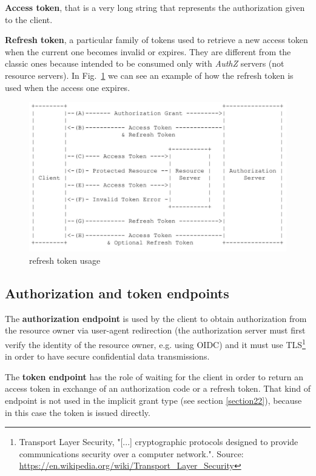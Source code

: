 \textbf{Access token}, that is a very long string that represents the authorization given to the client.

\textbf{Refresh token}, a particular family of tokens used to retrieve a new access token when the current one becomes invalid or expires. They are different from the classic ones because intended to be consumed only with \textit{AuthZ} servers (not resource servers). In Fig.~\ref{fig:refreshtok} we can see an example of how the refresh token is used when the access one expires.



\begin{figure}
    \centering
    \includegraphics[scale=0.5]{chapters/images/chp2/tokenref.jpg}
    \caption{ refresh token usage}
    \label{fig:refreshtok}
\end{figure}

\vspace{1cm}

\subsection{Authorization and token endpoints}
The \textbf{authorization endpoint} is used by the client to obtain authorization from the resource owner via user-agent redirection (the authorization server must first verify the identity of the resource owner, e.g. using OIDC) and it must use TLS\footnote{Transport Layer Security, "[...] cryptographic protocols designed to provide communications security over a computer network.". Source: \url{https://en.wikipedia.org/wiki/Transport_Layer_Security}} in order to have secure confidential data transmissions.

The \textbf{token endpoint} has the role of waiting for the client in order to return an access token in exchange of an authorization code or a refresh token. That kind of endpoint is not used in the implicit grant type (see section \ref{section22}), because in this case the token is issued directly.

